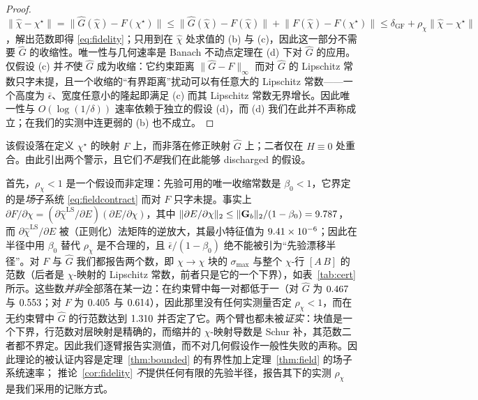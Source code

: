 \documentclass[UTF8,a4paper,11pt]{ctexart}
\newcommand{\norm}[1]{\lVert #1 \rVert}
\newcommand{\numv}[1]{#1}
\begin{document}
\begin{proof}
$\norm{\hat\chi-\chi^{\star}}=\norm{\hat G(\hat\chi)-F(\chi^{\star})}
\le\norm{\hat G(\hat\chi)-F(\hat\chi)}+\norm{F(\hat\chi)-F(\chi^{\star})}
\le\delta_{\mathrm{GF}}+\rho_\chi\norm{\hat\chi-\chi^{\star}}$，解出范数即得 \eqref{eq:fidelity}；只用到在 $\hat\chi$ 处求值的 (b) 与 (c)，因此这一部分不需要 $\hat G$ 的收缩性。唯一性与几何速率是 Banach 不动点定理在 (d) 下对 $\hat G$ 的应用。仅假设 (c) 并\emph{不}使 $\hat G$ 成为收缩：它约束距离 $\norm{\hat G-F}_\infty$ 而对 $\hat G$ 的 Lipschitz 常数只字未提，且一个收缩的“有界距离”扰动可以有任意大的 Lipschitz 常数——一个高度为 $\bar\epsilon$、宽度任意小的隆起即满足 (c) 而其 Lipschitz 常数无界增长。因此唯一性与 $O(\log(1/\delta))$ 速率依赖于独立的假设 (d)，而 (d) 我们在此并不声称成立；在我们的实测中连更弱的 (b) 也不成立。
\end{proof}
该假设落在定义 $\chi^{\star}$ 的映射 $F$ 上，而非落在修正映射 $\hat G$ 上；二者仅在 $H\equiv0$ 处重合。由此引出两个警示，且它们\emph{不是}我们在此能够 discharged 的假设。

首先，$\rho_\chi<1$ 是一个假设而非定理：先验可用的唯一收缩常数是 $\beta_0<1$，它界定的是\emph{场}子系统 \eqref{eq:fieldcontract} 而对 $F$ 只字未提。事实上
$\partial F/\partial\chi=(\partial\hat\chi^{\mathrm{LS}}/\partial E)(\partial E/\partial\chi)$，其中
$\norm{\partial E/\partial\chi}_2\le\norm{\mathbf{G}_b}_2/(1-\beta_0)=\numv{\NumdEdChi}$，而
$\partial\hat\chi^{\mathrm{LS}}/\partial E$ 被（正则化）法矩阵的逆放大，其最小特征值为 $\numv{\NumLamMin}$；因此在半径中用 $\beta_0$ 替代 $\rho_\chi$ 是不合理的，且 $\bar\epsilon/(1-\beta_0)$ 绝不能被引为“先验漂移半径”。对 $F$ 与 $\hat G$ 我们都报告两个数，即 $\chi\!\to\!\chi$ 块的 $\sigma_{\max}$ 与整个 $\chi$-行 $[A\,B]$ 的范数（后者是 $\chi$-映射的 Lipschitz 常数，前者只是它的一个下界），如表~\ref{tab:cert} 所示。这些数\emph{并非}全部落在某一边：在约束臂中每一对都低于一（对 $\hat G$ 为 $\numv{\NumRhoChiCons}$ 与 $\numv{\NumChiLipRowCons}$；对 $F$ 为 $\numv{\NumChiFBlockCons}$ 与 $\numv{\NumChiLipRowFCons}$），因此那里没有任何实测量否定 $\rho_\chi<1$，而在无约束臂中 $\hat G$ 的行范数达到 $\numv{\NumChiLipRowUnc}$ 并否定了它。两个臂也都未被\emph{证实}：块值是一个下界，行范数对层映射是精确的，而缩并的 $\chi$-映射导数是 Schur 补，其范数二者都不界定。因此我们逐臂报告实测值，而不对几何假设作一般性失败的声称。因此理论的被认证内容是定理~\ref{thm:bounded} 的有界性加上定理~\ref{thm:field} 的场子系统速率；
推论~\ref{cor:fidelity} \emph{不}提供任何有限的先验半径，报告其下的实测 $\rho_\chi$ 是我们采用的记账方式。
\end{document}
